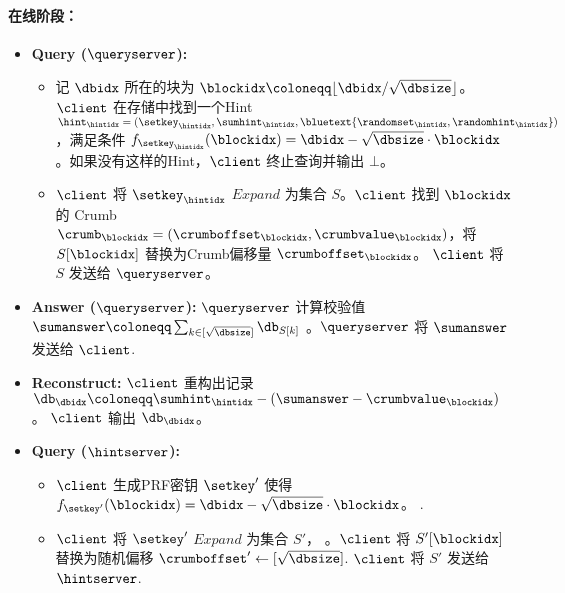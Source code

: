 \begin{mdframed}
        \paragraph{在线阶段：}
        \begin{itemize}
            \item \textbf{Query ($\queryserver$):}
                  \begin{itemize}
                      \item 记 $\dbidx$ 所在的块为 $\blockidx\coloneqq \lfloor \dbidx/\sqrt{\dbsize}\rfloor$。 $\client$ 在存储中找到一个Hint $\hint_\hintidx = (\setkey_\hintidx,\sumhint_\hintidx,\bluetext{\randomset_\hintidx,\randomhint_\hintidx})$，满足条件 $f_{\setkey_\hintidx}(\blockidx) = \dbidx-\sqrt{\dbsize}\cdot \blockidx$。如果没有这样的Hint，$\client$ 终止查询并输出 $\bot$。
                      \item $\client$ 将 $\setkey_\hintidx$ $Expand$ 为集合 $S$。$\client$ 找到 $\blockidx$ 的 Crumb $\crumb_\blockidx=(\crumboffset_\blockidx, \crumbvalue_\blockidx)$，将 $S[\blockidx]$ 替换为Crumb偏移量 $\crumboffset_\blockidx$。  $\client$ 将 $S$  发送给 $\queryserver$。
                  \end{itemize}
            \item \textbf{Answer ($\queryserver$):} $\queryserver$ 计算校验值 $\sumanswer\coloneqq \sum_{k\in [\sqrt{\dbsize}]}\db_{S[k]}$ 。$\queryserver$ 将 $\sumanswer$  发送给 $\client$.
            \item \textbf{Reconstruct:} $\client$ 重构出记录 $\db_\dbidx \coloneqq  \sumhint_\hintidx-(\sumanswer-\crumbvalue_\blockidx)$。  $\client$ 输出 $\db_\dbidx$。
            \item \textbf{Query ($\hintserver$):}
                  \begin{itemize}
                      \item $\client$ 生成PRF密钥 $\setkey'$ 使得 $f_{\setkey'}(\blockidx) = \dbidx-\sqrt{\dbsize}\cdot \blockidx$。 .
                      \item $\client$ 将 $\setkey'$ $Expand$ 为集合 $S'$， 。$\client$ 将 $S'[\blockidx]$ 替换为随机偏移 $\crumboffset' \leftarrow [\sqrt{\dbsize}]$. $\client$ 将 $S'$ 发送给 $\hintserver$.

\end{itemize}
\end{itemize}
\end{mdframed}
